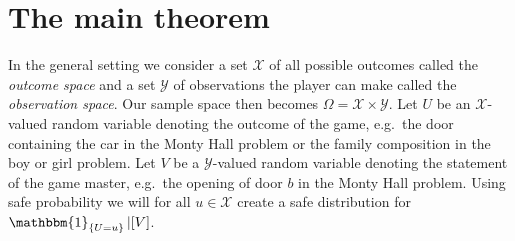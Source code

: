 \documentclass[a4paper]{report}
\theoremstyle{plain}
\theoremstyle{definition}
\theoremstyle{remark}
\numberwithin{equation}{chapter}
\DeclareMathOperator{\1}{\mathbbm{1}}
\newcommand{\X}{\mathcal{X}}
\newcommand{\Y}{\mathcal{Y}}
\begin{document}
\section{The main theorem}\label{sec:DiscMain}
In the general setting we consider a set $\X$ of all possible outcomes called the \emph{outcome space} and a set $\Y$ of observations the player can make called the \emph{observation space}. Our sample space then becomes $\Omega=\X\times\Y$. Let $U$ be an $\X$-valued random variable denoting the outcome of the game, e.g.~the door containing the car in the Monty Hall problem or the family composition in the boy or girl problem. Let $V$ be a $\Y$-valued random variable denoting the statement of the game master, e.g.~the opening of door $b$ in the Monty Hall problem. Using safe probability we will for all $u\in\X$ create a safe distribution for $\1_{\{U=u\}}|[V]$.
\end{document}
